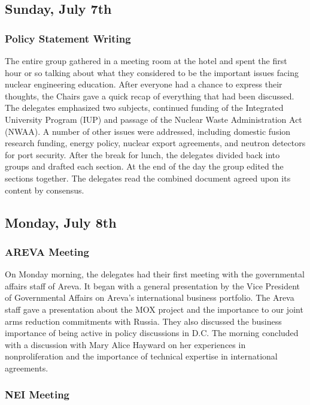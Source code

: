 
\subsection*{Sunday, July 7th}

\subsubsection*{Policy Statement Writing}

The entire group gathered in a meeting room at the hotel and spent the first
hour or so talking about what they considered to be the important issues facing
nuclear engineering education. After everyone had a chance to express their
thoughts, the Chairs gave a quick recap of everything that had been
discussed. The delegates emphasized two subjects, continued funding of the
Integrated University Program (IUP) and passage of the Nuclear Waste
Administration Act (NWAA). A number of other issues were addressed, including
domestic fusion research funding, energy policy, nuclear export agreements, and
neutron detectors for port security. After the break for lunch, the delegates
divided back into groups and drafted each section. At the end of the day the
group edited the sections together. The delegates read the combined document
agreed upon its content by consensus.  

\subsection*{Monday, July 8th}

\subsubsection*{AREVA Meeting} 

On Monday morning, the delegates had their first meeting with the governmental
affairs staff of Areva. It began with a general presentation by the Vice
President of Governmental Affairs on Areva's international business
portfolio. The Areva staff gave a presentation about the MOX project and the
importance to our joint arms reduction commitments with Russia. They also
discussed the business importance of being active in policy discussions in
D.C. The morning concluded with a discussion with Mary Alice Hayward on her
experiences in nonproliferation and the importance of technical expertise in
international agreements.

\subsubsection*{NEI Meeting} 

